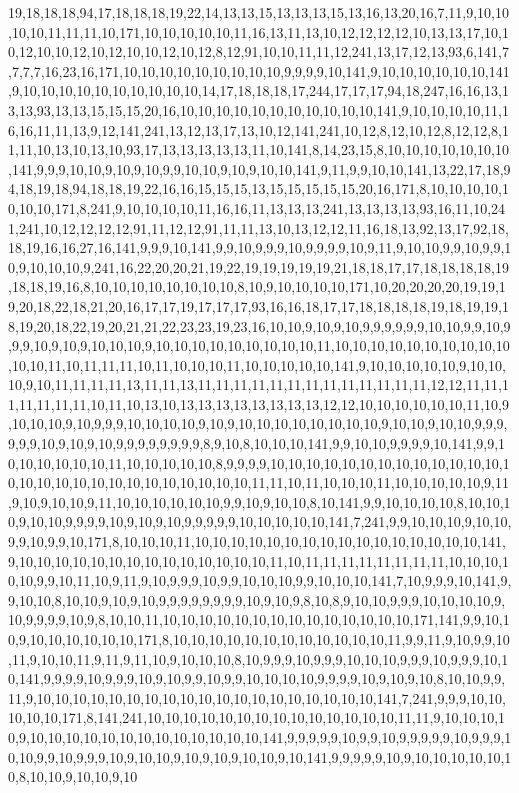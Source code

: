 19,18,18,18,94,17,18,18,18,19,22,14,13,13,15,13,13,13,15,13,16,13,20,16,7,11,9,10,10,10,10,11,11,11,10,171,10,10,10,10,10,11,16,13,11,13,10,12,12,12,12,10,13,13,17,10,10,12,10,10,12,10,12,10,10,12,10,12,8,12,91,10,10,11,11,12,241,13,17,12,13,93,6,141,7,7,7,7,16,23,16,171,10,10,10,10,10,10,10,10,10,9,9,9,9,10,141,9,10,10,10,10,10,10,141,9,10,10,10,10,10,10,10,10,10,10,14,17,18,18,18,17,244,17,17,17,94,18,247,16,16,13,13,13,93,13,13,15,15,15,20,16,10,10,10,10,10,10,10,10,10,10,10,141,9,10,10,10,10,11,16,16,11,11,13,9,12,141,241,13,12,13,17,13,10,12,141,241,10,12,8,12,10,12,8,12,12,8,11,11,10,13,10,13,10,93,17,13,13,13,13,13,11,10,141,8,14,23,15,8,10,10,10,10,10,10,10,141,9,9,9,10,10,9,10,9,10,9,9,10,10,9,10,9,10,10,141,9,11,9,9,10,10,141,13,22,17,18,94,18,19,18,94,18,18,19,22,16,16,15,15,15,13,15,15,15,15,15,20,16,171,8,10,10,10,10,10,10,10,171,8,241,9,10,10,10,10,11,16,16,11,13,13,13,241,13,13,13,13,93,16,11,10,241,241,10,12,12,12,12,91,11,12,12,91,11,11,13,10,13,12,12,11,16,18,13,92,13,17,92,18,18,19,16,16,27,16,141,9,9,9,10,141,9,9,10,9,9,9,10,9,9,9,9,10,9,11,9,10,10,9,9,10,9,9,10,9,10,10,10,9,241,16,22,20,20,21,19,22,19,19,19,19,19,21,18,18,17,17,18,18,18,18,19,18,18,19,16,8,10,10,10,10,10,10,10,10,8,10,9,10,10,10,10,171,10,20,20,20,20,19,19,19,20,18,22,18,21,20,16,17,17,19,17,17,17,93,16,16,18,17,17,18,18,18,18,19,18,19,19,18,19,20,18,22,19,20,21,21,22,23,23,19,23,16,10,10,9,10,9,10,9,9,9,9,9,9,10,10,9,9,10,9,9,9,10,9,10,9,10,10,10,9,10,10,10,10,10,10,10,10,10,11,10,10,10,10,10,10,10,10,10,10,10,10,11,10,11,11,11,10,11,10,10,10,11,10,10,10,10,10,141,9,10,10,10,10,10,9,10,10,10,9,10,11,11,11,11,13,11,11,13,11,11,11,11,11,11,11,11,11,11,11,11,11,12,12,11,11,11,11,11,11,11,10,11,10,13,10,13,13,13,13,13,13,13,13,12,12,10,10,10,10,10,10,11,10,9,10,10,10,9,10,9,9,9,10,10,10,10,9,10,9,10,10,10,10,10,10,10,10,9,10,10,9,10,10,9,9,9,9,9,9,10,9,10,9,10,9,9,9,9,9,9,9,9,8,9,10,8,10,10,10,141,9,9,10,10,9,9,9,9,10,141,9,9,10,10,10,10,10,10,11,10,10,10,10,10,8,9,9,9,9,10,10,10,10,10,10,10,10,10,10,10,10,10,10,10,10,10,10,10,10,10,10,10,10,10,10,10,11,11,10,11,10,10,10,11,10,10,10,10,10,9,11,9,10,9,10,10,9,11,10,10,10,10,10,10,9,9,10,9,10,10,8,10,141,9,9,10,10,10,10,8,10,10,10,9,10,10,9,9,9,9,10,9,10,9,10,9,9,9,9,9,10,10,10,10,10,141,7,241,9,9,10,10,10,9,10,10,9,9,10,9,9,10,171,8,10,10,10,11,10,10,10,10,10,10,10,10,10,10,10,10,10,10,10,10,141,9,10,10,10,10,10,10,10,10,10,10,10,10,10,10,11,10,11,11,11,11,11,11,11,11,10,10,10,10,10,9,9,10,11,10,9,11,9,10,9,9,9,10,9,9,10,10,10,9,9,10,10,10,141,7,10,9,9,9,10,141,9,9,10,10,8,10,10,9,10,9,10,9,9,9,9,9,9,9,9,10,9,10,9,8,10,8,9,10,10,9,9,9,10,10,10,10,9,10,9,9,9,9,10,9,8,10,10,11,10,10,10,10,10,10,10,10,10,10,10,10,10,10,171,141,9,9,10,10,9,10,10,10,10,10,10,171,8,10,10,10,10,10,10,10,10,10,10,10,10,11,9,9,11,9,10,9,9,10,11,9,10,10,11,9,11,9,11,10,9,10,10,10,8,10,9,9,9,10,9,9,9,10,10,10,9,9,9,10,9,9,9,10,10,141,9,9,9,9,10,9,9,9,10,9,10,9,9,10,9,9,10,10,10,10,9,9,9,9,10,9,10,9,10,8,10,10,9,9,11,9,10,10,10,10,10,10,10,10,10,10,10,10,10,10,10,10,10,10,10,141,7,241,9,9,9,10,10,10,10,10,171,8,141,241,10,10,10,10,10,10,10,10,10,10,10,10,10,10,11,11,9,10,10,10,10,9,10,10,10,10,10,10,10,10,10,10,10,10,10,141,9,9,9,9,9,10,9,9,10,9,9,9,9,9,10,9,9,9,10,10,9,9,10,9,9,9,10,9,10,10,9,10,9,10,9,10,10,9,10,141,9,9,9,9,9,10,9,10,10,10,10,10,10,8,10,10,9,10,10,9,10